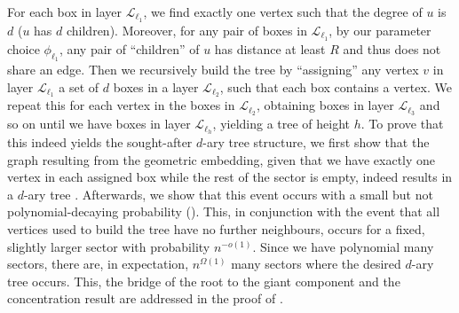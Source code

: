 \documentclass[letterpaper,11pt]{article}
\newcommand{\1}{\mathbb I}
\newcommand{\Layer}[1]{\mathcal{L}_{#1}}
\begin{document}
For each box in layer $\Layer{\ell_1}$, we find exactly one vertex such that the degree of $u$ is $d$ ($u$ has $d$ children). Moreover, for any pair of boxes in $\Layer{\ell_1}$, by our parameter choice $\phi_{\ell_1}$, any pair of ``children'' of $u$ has distance at least $R$ and thus does not share an edge. Then we recursively build the tree by ``assigning'' any vertex $v$ in layer $\Layer{\ell_1}$ a set of $d$ boxes in a layer $\Layer{\ell_2}$, such that each box contains a vertex. We repeat this for each vertex in the boxes in $\Layer{\ell_2}$, obtaining boxes in layer $\Layer{\ell_3}$ and so on until we have boxes in layer $\Layer{\ell_h}$, yielding a tree of height $h$. To prove that this indeed yields the sought-after $d$-ary tree structure, we first show that the graph resulting from the geometric embedding, given that we have exactly one vertex in each assigned box while the rest of the sector is empty, indeed results in a $d$-ary tree . Afterwards, we show that this event occurs with a small but not polynomial-decaying probability (). This, in conjunction with the event that all vertices used to build the tree have no further neighbours, occurs for a fixed, slightly larger sector with probability $n^{-o(1)}$. Since we have polynomial many sectors, there are, in expectation, $ n^{\Omega(1)}$ many sectors where the desired $d$-ary tree occurs. This, the bridge of the root to the giant component and the concentration result are addressed in the proof of .
\end{document}
